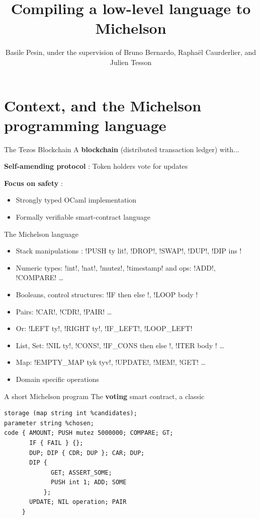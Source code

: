 \documentclass[aspectratio=169]{beamer}
\title{Compiling a low-level language to Michelson}
\author{Basile Pesin, under the supervision of Bruno Bernardo, Raphaël Caurderlier, and Julien Tesson}
\institute{Nomadic Labs}
\begin{document}
\maketitle

\section{Context, and the Michelson programming language}

\begin{frame}{The Tezos Blockchain}
  A \textbf{blockchain} (distributed transaction ledger) with...

  \textbf{Self-amending protocol} : Token holders vote for updates

  \textbf{Focus on safety} :
  \begin{itemize}
    \item Strongly typed OCaml implementation
    \item Formally verifiable smart-contract language
  \end{itemize}
\end{frame}

\begin{frame}[fragile]{The Michelson language}
  \begin{itemize}
    \item Stack manipulations : !PUSH ty lit!, !DROP!, !SWAP!, !DUP!, !DIP { ins }! 
    \item Numeric types: !int!, !nat!, !mutez!, !timestamp! and ops: !ADD!, !COMPARE! \ldots
    \item Booleans, control structures: !IF { then } { else }!, !LOOP { body }!
    \item Pairs: !CAR!, !CDR!, !PAIR! \ldots
    \item Or: !LEFT ty!, !RIGHT ty!, !IF_LEFT!, !LOOP_LEFT!
    \item List, Set: !NIL ty!, !CONS!, !IF_CONS { then } { else }!, !ITER { body }! \ldots
    \item Map: !EMPTY_MAP tyk tyv!, !UPDATE!, !MEM!, !GET! \ldots
    \item Domain specific operations
  \end{itemize}
\end{frame}

\begin{frame}[fragile]{A short Michelson program}
The \textbf{voting} smart contract, a classic
{\footnotesize
\begin{lstlisting}[language=michelson]
storage (map string int %candidates);
parameter string %chosen;
code { AMOUNT; PUSH mutez 5000000; COMPARE; GT;
       IF { FAIL } {};
       DUP; DIP { CDR; DUP }; CAR; DUP;
       DIP {
             GET; ASSERT_SOME;
             PUSH int 1; ADD; SOME
           };
       UPDATE; NIL operation; PAIR
     }
\end{lstlisting}}
\end{frame}
\end{document}
